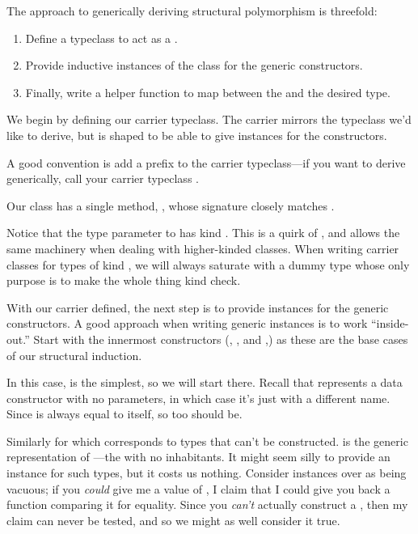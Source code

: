 \documentclass[book.tex]{subfiles}
\begin{document}
The approach to generically deriving structural polymorphism is threefold:

\begin{enumerate}
  \item{Define a typeclass to act as a .}
  \item{Provide inductive instances of the class for the generic constructors.}
  \item{Finally, write a helper function to map between the  and the
    desired type.}
\end{enumerate}

We begin by defining our carrier typeclass. The carrier mirrors the typeclass
we'd like to derive, but is shaped to be able to give instances for the 
constructors.

A good convention is add a  prefix to the carrier typeclass---if you want
to derive  generically, call your carrier typeclass .


Our  class has a single method, , whose signature closely
matches .

Notice that the type parameter  to  has kind .
This is a quirk of , and allows the same  machinery
when dealing with higher-kinded classes. When writing carrier classes for types
of kind , we will always saturate  with a dummy type 
whose only purpose is to make the whole thing kind check.

With our carrier defined, the next step is to provide instances for the generic
 constructors. A good approach when writing generic instances is to work
``inside-out.'' Start with the innermost constructors (, , and
,) as these are the base cases of our structural induction.

In this case,  is the simplest, so we will start there. Recall that
 represents a data constructor with no parameters, in which case it's
just \ty{()} with a different name. Since \ty{()} is always equal to itself, so
too should  be.


Similarly for  which corresponds to types that can't be constructed.
 is the generic representation of ---the  with no
inhabitants. It might seem silly to provide an  instance for such types,
but it costs us nothing. Consider instances over  as being vacuous; if
you \emph{could} give me a value of , I claim that I could give you back
a function comparing it for equality. Since you \emph{can't} actually construct
a , then my claim can never be tested, and so we might as well consider
it true.
\end{document}
